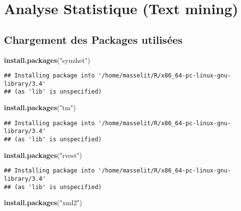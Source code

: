 \documentclass[]{article}
\newenvironment{Shaded}{\begin{snugshade}}{\end{snugshade}}
\newcommand{\KeywordTok}[1]{\textcolor[rgb]{0.13,0.29,0.53}{\textbf{#1}}}
\newcommand{\StringTok}[1]{\textcolor[rgb]{0.31,0.60,0.02}{#1}}
\newcommand{\NormalTok}[1]{#1}
\begin{document}
\section{Analyse Statistique (Text
mining)}\label{analyse-statistique-text-mining}

\subsection{Chargement des Packages
utilisées}\label{chargement-des-packages-utilisees}

\begin{Shaded}
\begin{Highlighting}[]
\KeywordTok{install.packages}\NormalTok{(}\StringTok{"syuzhet"}\NormalTok{)}
\end{Highlighting}
\end{Shaded}

\begin{verbatim}
## Installing package into '/home/masselit/R/x86_64-pc-linux-gnu-library/3.4'
## (as 'lib' is unspecified)
\end{verbatim}

\begin{Shaded}
\begin{Highlighting}[]
\KeywordTok{install.packages}\NormalTok{(}\StringTok{"tm"}\NormalTok{)}
\end{Highlighting}
\end{Shaded}

\begin{verbatim}
## Installing package into '/home/masselit/R/x86_64-pc-linux-gnu-library/3.4'
## (as 'lib' is unspecified)
\end{verbatim}

\begin{Shaded}
\begin{Highlighting}[]
\KeywordTok{install.packages}\NormalTok{(}\StringTok{"rvest"}\NormalTok{)}
\end{Highlighting}
\end{Shaded}

\begin{verbatim}
## Installing package into '/home/masselit/R/x86_64-pc-linux-gnu-library/3.4'
## (as 'lib' is unspecified)
\end{verbatim}

\begin{Shaded}
\begin{Highlighting}[]
\KeywordTok{install.packages}\NormalTok{(}\StringTok{"xml2"}\NormalTok{)}
\end{Highlighting}
\end{Shaded}
\end{document}

